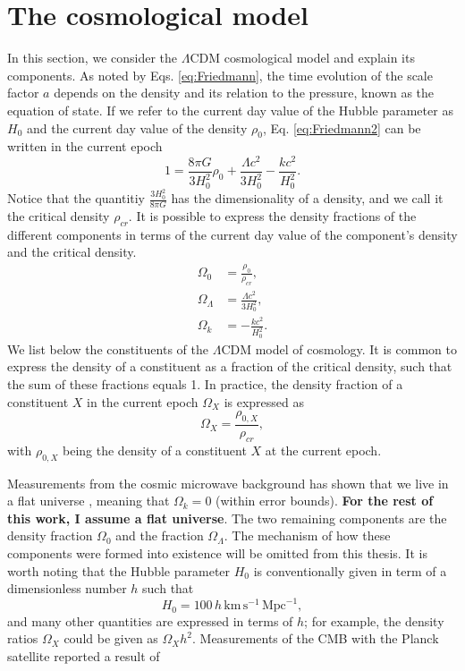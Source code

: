 \section{The cosmological model}\label{theory_sec:cosmo_model}
In this section, we consider the $\Lambda$CDM cosmological model and explain its components. As noted by Eqs. \ref{eq:Friedmann}, the time evolution of the scale factor $a$ depends on the density and its relation to the pressure, known as the equation of state. If we refer to the current day value of the Hubble parameter as $H_0$ and the current day value of the density $\rho_{0}$, Eq. \ref{eq:Friedmann2} can be written in the current epoch
\begin{equation}
    1 = \frac{8\pi G}{3H_0^2} \rho_0 + \frac{\Lambda c^2}{3H_0^2} - \frac{kc^2}{H_0^2} .
\end{equation}
Notice that the quantitiy $\frac{3H_0^2}{8\pi G}$ has the dimensionality of a density, and we call it the critical density $\rho_{cr}$. It is possible to express the density fractions of the different components in terms of the current day value of the component's density and the critical density.
\begin{subequations} \label{eq:Omega_params}
\begin{align}
    \Omega_0 &= \frac{\rho_0}{\rho_{cr}}  \label{eq:Omega_m}, \\
    \Omega_{\Lambda} &= \frac{\Lambda c^2}{3H_0^2} \label{eq:Omega_L}, \\
    \Omega_{k} &= -\frac{kc^2}{H_0^2} \label{eq:Omega_k}.
\end{align}
\end{subequations}
We list below the constituents of the $\Lambda$CDM model of cosmology. It is common to express the density of a constituent as a fraction of the critical density, such that the sum of these fractions equals 1. In practice, the density fraction of a constituent $X$ in the current epoch $\Omega_X$ is expressed as
\begin{equation}
    \Omega_X = \frac{\rho_{0, X}}{\rho_{cr}},
\end{equation}
with $\rho_{0, X}$ being the density of a constituent $X$ at the current epoch.

Measurements from the cosmic microwave background has shown that we live in a flat universe \citep{Smoot_1999}, meaning that $ \Omega_{k} = 0$ (within error bounds). \textbf{For the rest of this work, I assume a flat universe}. The two remaining components are the density fraction $\Omega_0$ and the fraction $\Omega_{\Lambda}$. The mechanism of how these components were formed into existence will be omitted from this thesis. It is worth noting that the Hubble parameter $H_0$ is conventionally given in term of a dimensionless number $h$ such that 
\begin{equation}
    H_0 = 100 \, h \, \mathrm{km} \, \mathrm{s}^{-1} \, \mathrm{Mpc}^{-1},
\end{equation}
and many other quantities are expressed in terms of $h$; for example, the density ratios $\Omega_X$ could be given as $\Omega_X h^2$. Measurements of the CMB with the Planck satellite \citep{aghanim2020planck} reported a result of 


